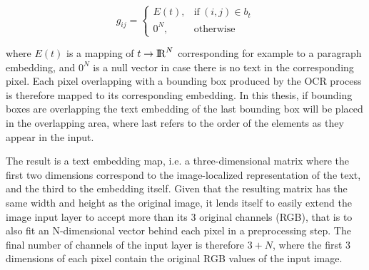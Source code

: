 \documentclass[oneside, english, bibtex]{kththesis}
\begin{document}
\begin{equation}
	g_{ij} =
	    \begin{cases}
	      E(t), & \text{if}\ (i,j) \in b_t \\
	      0^N, & \text{otherwise}
	    \end{cases}
  	\label{eqn:textembedding}
\end{equation}

where $E(t)$ is a mapping of $t \rightarrow {\rm I\!R}^N$ corresponding for example to a paragraph embedding, and $0^N$ is a null vector in case there is no text in the corresponding pixel. Each pixel overlapping with a bounding box produced by the OCR process is therefore mapped to its corresponding embedding. In this thesis, if bounding boxes are overlapping the text embedding of the last bounding box will be placed in the overlapping area, where last refers to the order of the elements as they appear in the input. 

The result is a text embedding map, i.e. a three-dimensional matrix where the first two dimensions correspond to the image-localized representation of the text, and the third to the embedding itself. Given that the resulting matrix has the same width and height as the original image, it lends itself to easily extend the image input layer to accept more than its 3 original channels (RGB), that is to also fit an N-dimensional vector behind each pixel in a preprocessing step. The final number of channels of the input layer is therefore $3+N$, where the first 3 dimensions of each pixel contain the original RGB values of the input image.
\end{document}
